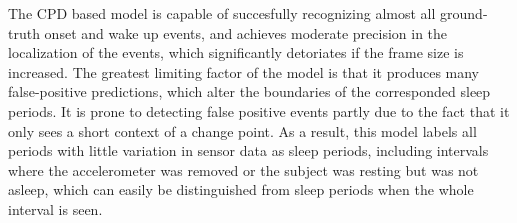 \documentclass{article}
\begin{document}
The CPD based model is capable of succesfully recognizing almost all ground-truth onset and wake up events, and achieves moderate precision in the localization of the events, which significantly detoriates if the frame size is increased. The greatest limiting factor of the model is that it produces many false-positive predictions, which alter the boundaries of the corresponded sleep periods. It is prone to detecting false positive events partly due to the fact that it only sees a short context of a change point. As a result, this model labels all periods with little variation in sensor data as sleep periods, including intervals where the accelerometer was removed or the subject was resting but was not asleep, which can easily be distinguished from sleep periods when the whole interval is seen.




\end{document}
